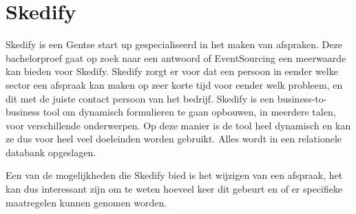 
\chapter{Skedify}
\label{ch:skedify}

Skedify is een Gentse start up gespecialiseerd in het maken van afspraken. Deze bachelorproef gaat op zoek naar een antwoord of EventSourcing een meerwaarde kan bieden voor Skedify. Skedify zorgt er voor dat een persoon in eender welke sector een afspraak kan maken op zeer korte tijd voor eender welk probleem, en dit met de juiste contact persoon van het bedrijf. Skedify is een business-to-business tool om dynamisch formulieren te gaan opbouwen, in meerdere talen, voor verschillende onderwerpen. Op deze manier is de tool heel dynamisch en kan ze dus voor heel veel doeleinden worden gebruikt. Alles wordt in een relationele databank opgeslagen.

Een van de mogelijkheden die Skedify bied is het wijzigen van een afspraak, het kan dus interessant zijn om te weten hoeveel keer dit gebeurt en of er specifieke maatregelen kunnen genomen worden.
